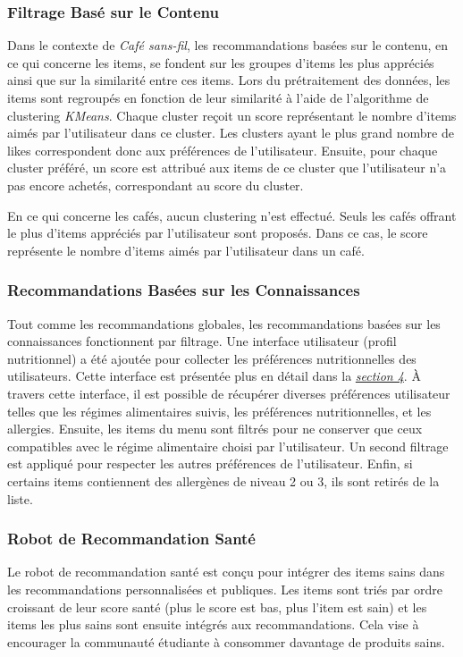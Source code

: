 \documentclass[11pt]{article}
\begin{document}
\subsubsection{Filtrage Basé sur le Contenu}
Dans le contexte de \textit{Café sans-fil}, les recommandations basées sur le contenu, en ce qui concerne les items, se fondent sur les groupes d'items les plus appréciés ainsi que sur la similarité entre ces items. Lors du prétraitement des données, les items sont regroupés en fonction de leur similarité à l'aide de l'algorithme de clustering \textit{KMeans}. Chaque cluster reçoit un score représentant le nombre d'items aimés par l'utilisateur dans ce cluster. Les clusters ayant le plus grand nombre de likes correspondent donc aux préférences de l'utilisateur. Ensuite, pour chaque cluster préféré, un score est attribué aux items de ce cluster que l'utilisateur n'a pas encore achetés, correspondant au score du cluster.\

En ce qui concerne les cafés, aucun clustering n'est effectué. Seuls les cafés offrant le plus d'items appréciés par l'utilisateur sont proposés. Dans ce cas, le score représente le nombre d'items aimés par l'utilisateur dans un café.

\subsubsection{Recommandations Basées sur les Connaissances}
Tout comme les recommandations globales, les recommandations basées sur les connaissances fonctionnent par filtrage. Une interface utilisateur (profil nutritionnel) a été ajoutée pour collecter les préférences nutritionnelles des utilisateurs. Cette interface est présentée plus en détail dans la \hyperref[implementation]{\textit{section 4}}. À travers cette interface, il est possible de récupérer diverses préférences utilisateur telles que les régimes alimentaires suivis, les préférences nutritionnelles, et les allergies. Ensuite, les items du menu sont filtrés pour ne conserver que ceux compatibles avec le régime alimentaire choisi par l'utilisateur. Un second filtrage est appliqué pour respecter les autres préférences de l'utilisateur. Enfin, si certains items contiennent des allergènes de niveau 2 ou 3, ils sont retirés de la liste.

\subsubsection{Robot de Recommandation Santé}
Le robot de recommandation santé est conçu pour intégrer des items sains dans les recommandations personnalisées et publiques. Les items sont triés par ordre croissant de leur score santé (plus le score est bas, plus l'item est sain) et les items les plus sains sont ensuite intégrés aux recommandations. Cela vise à encourager la communauté étudiante à consommer davantage de produits sains.
\end{document}
